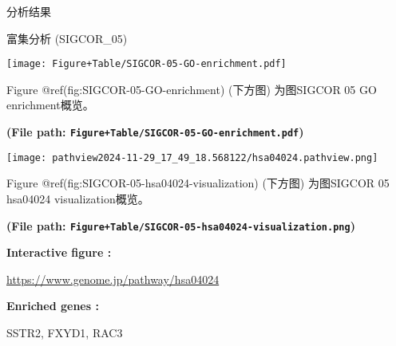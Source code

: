 \documentclass[
  ignorenonframetext,
]{beamer}
\begin{document}
\begin{frame}[fragile]{分析结果}
\begin{block}{富集分析 (SIGCOR\_05)}
\begin{center}\vspace{1.5cm}\end{center}
\def\@captype{figure}
\begin{center}
\texttt{[image: Figure+Table/SIGCOR-05-GO-enrichment.pdf]}
\caption{SIGCOR 05 GO enrichment}\label{fig:SIGCOR-05-GO-enrichment}
\end{center}

Figure @ref(fig:SIGCOR-05-GO-enrichment) (下方图) 为图SIGCOR 05 GO
enrichment概览。

\textbf{(File path: \texttt{Figure+Table/SIGCOR-05-GO-enrichment.pdf})}

\begin{center}\vspace{1.5cm}\end{center}

\begin{center}\vspace{1.5cm}\end{center}
\def\@captype{figure}
\begin{center}
\texttt{[image: pathview2024-11-29\_17\_49\_18.568122/hsa04024.pathview.png]}
\caption{SIGCOR 05 hsa04024 visualization}\label{fig:SIGCOR-05-hsa04024-visualization}
\end{center}

Figure @ref(fig:SIGCOR-05-hsa04024-visualization) (下方图) 为图SIGCOR 05
hsa04024 visualization概览。

\textbf{(File path:
\texttt{Figure+Table/SIGCOR-05-hsa04024-visualization.png})}

\begin{center}\begin{tcolorbox}[colback=gray!10, colframe=gray!50, width=0.9\linewidth, arc=1mm, boxrule=0.5pt]
\textbf{
Interactive figure
:}

\vspace{0.5em}

    \url{https://www.genome.jp/pathway/hsa04024}

\vspace{2em}


\textbf{
Enriched genes
:}

\vspace{0.5em}

    SSTR2, FXYD1, RAC3


\end{tcolorbox}
\end{center}
\end{block}
\end{frame}
\end{document}
